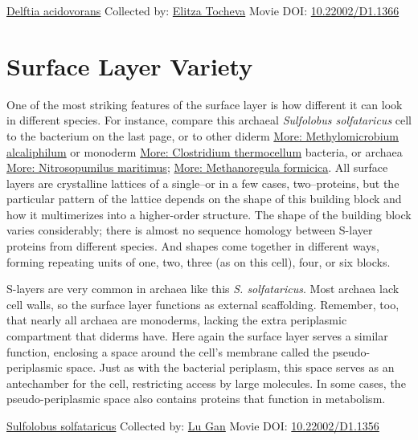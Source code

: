 \documentclass[]{tufte-book}
\begin{document}
\hypertarget{htmlwidget-b7ce28e2fc6529c02975}{}

\label{fig:2-6a}\protect\hyperlink{tree}{Delftia acidovorans} Collected by: \protect\hyperlink{elitza_tocheva}{Elitza Tocheva} Movie DOI: \href{https://doi.org/10.22002/D1.1366}{10.22002/D1.1366}

\hypertarget{surface-layer-variety}{%
\section{Surface Layer Variety}\label{surface-layer-variety}}

One of the most striking features of the surface layer is how different it can look in different species. For instance, compare this archaeal \emph{Sulfolobus solfataricus} cell to the bacterium on the last page, or to other diderm \protect\hyperlink{Methylomicrobium_alcaliphilum}{More: Methylomicrobium alcaliphilum} or monoderm \protect\hyperlink{Clostridium_thermocellum}{More: Clostridium thermocellum} bacteria, or archaea \protect\hyperlink{Nitrosopumilus_maritimus}{More: Nitrosopumilus maritimus}; \protect\hyperlink{Methanoregula_formicica}{More: Methanoregula formicica}. All surface layers are crystalline lattices of a single--or in a few cases, two--proteins, but the particular pattern of the lattice depends on the shape of this building block and how it multimerizes into a higher-order structure. The shape of the building block varies considerably; there is almost no sequence homology between S-layer proteins from different species. And shapes come together in different ways, forming repeating units of one, two, three (as on this cell), four, or six blocks.

S-layers are very common in archaea like this \emph{S. solfataricus}. Most archaea lack cell walls, so the surface layer functions as external scaffolding. Remember, too, that nearly all archaea are monoderms, lacking the extra periplasmic compartment that diderms have. Here again the surface layer serves a similar function, enclosing a space around the cell's membrane called the pseudo-periplasmic space. Just as with the bacterial periplasm, this space serves as an antechamber for the cell, restricting access by large molecules. In some cases, the pseudo-periplasmic space also contains proteins that function in metabolism.



\hypertarget{htmlwidget-9541f76ca3c7bec2ad14}{}

\label{fig:2-7}\protect\hyperlink{tree}{Sulfolobus solfataricus} Collected by: \protect\hyperlink{lu_gan}{Lu Gan} Movie DOI: \href{https://doi.org/10.22002/D1.1356}{10.22002/D1.1356}
\end{document}
